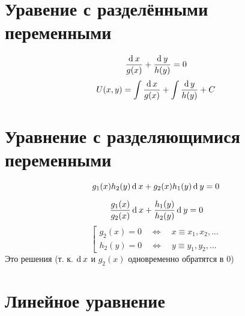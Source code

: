 \section{Уравение с разделёнными переменными}

$$ \frac{\di x}{g(x)} + \frac{\di y}{h(y)} = 0 $$
$$ U(x, y) = \ufint{g(x)} + \ufint[y]{h(y)} + C $$

\section{Уравнение с разделяющимися переменными}

$$ g_1(x)h_2(y)\di x + g_2(x)h_1(y)\di y = 0 $$
\antlersimp
\begin{multicols}{2}
    $$ \frac{g_1(x)}{g_2(x)}\di x + \frac{h_1(y)}{h_2(y)}\di y = 0 $$
    \columnbreak
    $$ \left[
    \begin{aligned}
        g_2(x) = 0 \quad \iff \quad x \equiv x_1, x_2, ... \\
        h_2(y) = 0 \quad \iff \quad y \equiv y_1, y_2, ...
    \end{aligned} \right. $$
    Это решения (т. к. $ \di x $ и $ g_2(x) $ одновременно обратятся в 0)
\end{multicols}

\section{Линейное уравнение}

